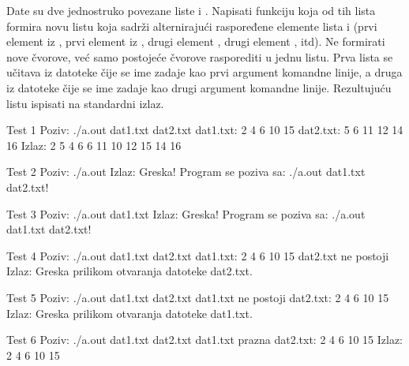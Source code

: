\begin{Exercise}[label=610]
Date su dve jednostruko povezane liste  i . Napisati funkciju koja od 
tih lista formira novu listu  koja sadrži alternirajući raspoređene elemente 
lista  i  (prvi element iz , prvi element iz , drugi element ,
drugi element , itd). Ne formirati nove čvorove, već samo postojeće čvorove 
rasporediti u jednu listu. Prva lista se učitava iz datoteke čije se ime zadaje kao prvi argument komandne linije, a druga iz datoteke čije se ime zadaje kao 
drugi argument komandne linije. Rezultujuću listu ispisati 
na standardni izlaz. 

\noindent
\begin{miditest}
\begin{test}{Test 1}
Poziv: ./a.out dat1.txt dat2.txt
dat1.txt: 2 4 6 10 15
dat2.txt: 5 6 11 12 14 16
Izlaz:  
  2 5 4 6 6 11 10 12 15 14 16
\end{test}
\end{miditest}
\begin{miditest}
\begin{test}{Test 2}
Poziv: ./a.out
Izlaz: 
  Greska! Program se poziva sa: 
  ./a.out dat1.txt dat2.txt!
\end{test}
\end{miditest}  
\begin{miditest}
\begin{test}{Test 3}
Poziv: ./a.out dat1.txt 
Izlaz: 
  Greska! Program se poziva sa: 
  ./a.out dat1.txt dat2.txt!
\end{test}
\end{miditest}
\begin{miditest}
\begin{test}{Test 4}
Poziv: ./a.out dat1.txt dat2.txt
dat1.txt: 2 4 6 10 15
dat2.txt ne postoji
Izlaz: 
  Greska prilikom otvaranja datoteke 
  dat2.txt.
\end{test}
\end{miditest}
\begin{miditest}
\begin{test}{Test 5}
Poziv: ./a.out dat1.txt dat2.txt
dat1.txt ne postoji
dat2.txt: 2 4 6 10 15
Izlaz: 
  Greska prilikom otvaranja datoteke 
  dat1.txt.
\end{test}
\end{miditest}
\begin{miditest}
\begin{test}{Test 6}
Poziv: ./a.out dat1.txt dat2.txt
dat1.txt prazna
dat2.txt: 2 4 6 10 15
Izlaz: 
  2 4 6 10 15
\end{test}
\end{miditest}
\end{Exercise}
\begin{Answer}[ref=610]
\end{Answer}

